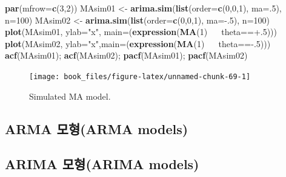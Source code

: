 \documentclass[b5paper,]{book}
\makeatletter
\newenvironment{Shaded}{\begin{snugshade}}{\end{snugshade}}
\newcommand{\KeywordTok}[1]{\textcolor[rgb]{0.13,0.29,0.53}{\textbf{{#1}}}}
\newcommand{\DataTypeTok}[1]{\textcolor[rgb]{0.13,0.29,0.53}{{#1}}}
\newcommand{\DecValTok}[1]{\textcolor[rgb]{0.00,0.00,0.81}{{#1}}}
\newcommand{\StringTok}[1]{\textcolor[rgb]{0.31,0.60,0.02}{{#1}}}
\newcommand{\ErrorTok}[1]{\textcolor[rgb]{0.64,0.00,0.00}{\textbf{{#1}}}}
\newcommand{\NormalTok}[1]{{#1}}
\newenvironment{kframe}{%
\medskip{}
\setlength{\fboxsep}{.8em}
 \def\at@end@of@kframe{}%
 \ifinner\ifhmode%
  \def\at@end@of@kframe{\end{minipage}}%
  \begin{minipage}{\columnwidth}%
 \fi\fi%
 \def\FrameCommand##1{\hskip\@totalleftmargin \hskip-\fboxsep
 \colorbox{shadecolor}{##1}\hskip-\fboxsep
     \hskip-\linewidth \hskip-\@totalleftmargin \hskip\columnwidth}%
 \MakeFramed {\advance\hsize-\width
   \@totalleftmargin\z@ \linewidth\hsize
   \@setminipage}}%
 {\par\unskip\endMakeFramed%
 \at@end@of@kframe}
\renewenvironment{Shaded}{\begin{kframe}}{\end{kframe}}
\theoremstyle{definition}
\theoremstyle{definition}
\theoremstyle{definition}
\theoremstyle{remark}
\makeatother
\begin{document}
\begin{Shaded}
\begin{Highlighting}[]
\KeywordTok{par}\NormalTok{(}\DataTypeTok{mfrow=}\KeywordTok{c}\NormalTok{(}\DecValTok{3}\NormalTok{,}\DecValTok{2}\NormalTok{))   }
\NormalTok{MAsim01 <-}\StringTok{ }\KeywordTok{arima.sim}\NormalTok{(}\KeywordTok{list}\NormalTok{(}\DataTypeTok{order=}\KeywordTok{c}\NormalTok{(}\DecValTok{0}\NormalTok{,}\DecValTok{0}\NormalTok{,}\DecValTok{1}\NormalTok{), }\DataTypeTok{ma=}\NormalTok{.}\DecValTok{5}\NormalTok{), }\DataTypeTok{n=}\DecValTok{100}\NormalTok{)}
\NormalTok{MAsim02 <-}\StringTok{ }\KeywordTok{arima.sim}\NormalTok{(}\KeywordTok{list}\NormalTok{(}\DataTypeTok{order=}\KeywordTok{c}\NormalTok{(}\DecValTok{0}\NormalTok{,}\DecValTok{0}\NormalTok{,}\DecValTok{1}\NormalTok{), }\DataTypeTok{ma=}\NormalTok{-.}\DecValTok{5}\NormalTok{), }\DataTypeTok{n=}\DecValTok{100}\NormalTok{)}
\KeywordTok{plot}\NormalTok{(MAsim01, }\DataTypeTok{ylab=}\StringTok{"x"}\NormalTok{, }\DataTypeTok{main=}\NormalTok{(}\KeywordTok{expression}\NormalTok{(}\KeywordTok{MA}\NormalTok{(}\DecValTok{1}\NormalTok{)~}\ErrorTok{~~}\NormalTok{theta==+.}\DecValTok{5}\NormalTok{)))    }
\KeywordTok{plot}\NormalTok{(MAsim02, }\DataTypeTok{ylab=}\StringTok{"x"}\NormalTok{,}\DataTypeTok{main=}\NormalTok{(}\KeywordTok{expression}\NormalTok{(}\KeywordTok{MA}\NormalTok{(}\DecValTok{1}\NormalTok{)~}\ErrorTok{~~}\NormalTok{theta==-.}\DecValTok{5}\NormalTok{))) }
\KeywordTok{acf}\NormalTok{(MAsim01); }\KeywordTok{acf}\NormalTok{(MAsim02); }\KeywordTok{pacf}\NormalTok{(MAsim01); }\KeywordTok{pacf}\NormalTok{(MAsim02)}
\end{Highlighting}
\end{Shaded}

\begin{figure}

{\centering \texttt{[image: book\_files/figure-latex/unnamed-chunk-69-1]} 

}

\caption{Simulated MA model.}\label{fig:unnamed-chunk-69}
\end{figure}

\subsection{ARMA 모형(ARMA models)}\label{arma-arma-models}

\subsection{ARIMA 모형(ARIMA models)}\label{arima-arima-models}
\end{document}
